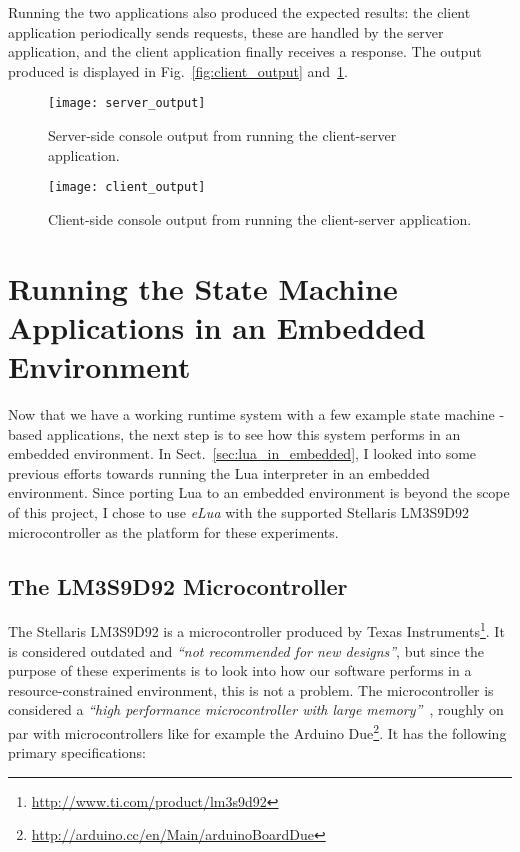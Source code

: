 Running the two applications also produced the expected results: the client application periodically sends requests, these are handled by the server application, and the client application finally receives a response. The output produced is displayed in Fig.~\ref{fig:client_output} and~\ref{fig:server_output}.

\begin{figure}[htp]
	\centering
	\begin{minipage}{0.45\linewidth}
		\texttt{[image: server\_output]}
		\caption{Server-side console output from running the client-server application.}
		\label{fig:client_output}
	\end{minipage}
	\quad
	\begin{minipage}{0.45\linewidth}
		\texttt{[image: client\_output]}
		\caption{Client-side console output from running the client-server application.}
		\label{fig:server_output}
	\end{minipage}
\end{figure}

\FloatBarrier
\section{Running the State Machine Applications in an Embedded Environment}
\label{sec:running_on_micro}
Now that we have a working runtime system with a few example state machine -based applications, the next step is to see how this system performs in an embedded environment. In Sect.~\ref{sec:lua_in_embedded}, I looked into some previous efforts towards running the Lua interpreter in an embedded environment. Since porting Lua to an embedded environment is beyond the scope of this project, I chose to use \emph{eLua} with the supported Stellaris LM3S9D92 microcontroller as the platform for these experiments.

\subsection{The LM3S9D92 Microcontroller}
\label{sec:microcontroller}
The Stellaris LM3S9D92 is a microcontroller produced by Texas Instruments\footnote{\url{http://www.ti.com/product/lm3s9d92}}. It is considered outdated and \emph{``not recommended for new designs''}, but since the purpose of these experiments is to look into how our software performs in a resource-constrained environment, this is not a problem. The microcontroller is considered a \emph{``high performance microcontroller with large memory''}~\cite{website:stellaris_micro}, roughly on par with microcontrollers like for example the Arduino Due\footnote{\url{http://arduino.cc/en/Main/arduinoBoardDue}}. It has the following primary specifications:

